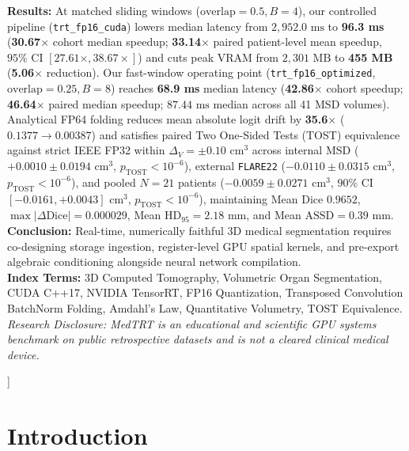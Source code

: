 \documentclass[10pt,twocolumn]{article}
\begin{document}
{\begin{@twocolumnfalse}
{\begin{minipage}{\dimexpr\textwidth-2\fboxsep-2\fboxrule\relax}
\textbf{Results:} At matched sliding windows ($\text{overlap}=0.5, B=4$), our controlled pipeline (\texttt{trt\_fp16\_cuda}) lowers median latency from $2,952.0\text{ ms}$ to \textbf{96.3 ms} (\textbf{30.67$\times$} cohort median speedup; \textbf{33.14$\times$} paired patient-level mean speedup, $95\%$ CI $[27.61\times, 38.67\times]$) and cuts peak VRAM from $2,301\text{ MB}$ to \textbf{455 MB} (\textbf{5.06$\times$} reduction). Our fast-window operating point (\texttt{trt\_fp16\_optimized}, $\text{overlap}=0.25, B=8$) reaches \textbf{68.9 ms} median latency (\textbf{42.86$\times$} cohort speedup; \textbf{46.64$\times$} paired median speedup; $87.44\text{ ms}$ median across all 41 MSD volumes). Analytical FP64 folding reduces mean absolute logit drift by \textbf{35.6$\times$} ($0.1377 \to 0.00387$) and satisfies paired Two One-Sided Tests (TOST) equivalence against strict IEEE FP32 within $\Delta_V = \pm 0.10\text{ cm}^3$ across internal MSD ($+0.0010 \pm 0.0194\text{ cm}^3$, $p_{\text{TOST}} < 10^{-6}$), external \texttt{FLARE22} ($-0.0110 \pm 0.0315\text{ cm}^3$, $p_{\text{TOST}} < 10^{-6}$), and pooled $N = 21$ patients ($-0.0059 \pm 0.0271\text{ cm}^3$, $90\%$ CI $[-0.0161, +0.0043]\text{ cm}^3$, $p_{\text{TOST}} < 10^{-6}$), maintaining Mean Dice $0.9652$, $\max |\Delta\text{Dice}| = 0.000029$, Mean $\text{HD}_{95} = 2.18\text{ mm}$, and Mean $\text{ASSD} = 0.39\text{ mm}$.
\textbf{Conclusion:} Real-time, numerically faithful 3D medical segmentation requires co-designing storage ingestion, register-level GPU spatial kernels, and pre-export algebraic conditioning alongside neural network compilation.\\[3pt]
\noindent\textbf{\color{navyaccent}Index Terms:} 3D Computed Tomography, Volumetric Organ Segmentation, CUDA C++17, NVIDIA TensorRT, FP16 Quantization, Transposed Convolution BatchNorm Folding, Amdahl's Law, Quantitative Volumetry, TOST Equivalence.\\[2pt]
\noindent\textit{Research Disclosure: MedTRT is an educational and scientific GPU systems benchmark on public retrospective datasets and is not a cleared clinical medical device.}
\vspace{2pt}
\end{minipage}%
}
\vspace{10pt}
\end{@twocolumnfalse}%
}]

\section{Introduction}
\label{sec:intro}
\end{document}
